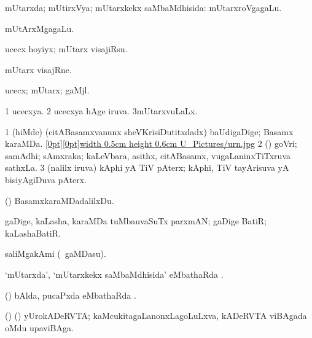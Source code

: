 {{\bentry
{} 
\gl{\gu}
\expl{}
\bmng
mUtarxda; mUtirxVya; mUtarxkekx saMbaMdhisida:  mUtarxroVgagaLu. 
\emng

\noindent 
\gl{\pagu}
\expl{}
\bmng
{} mUtArxMgagaLu. 
\emng
\eentry

\bentry
{} 
\gl{\akirx}
\expl{}
\bmng
ucecx hoyiyx; mUtarx visajiRsu. 
\emng
\eentry

\bentry
{} 
\gl{\nA}
\expl{}
\bmng
mUtarx visajRne. 
\emng
\eentry

\bentry
{} 
\gl{\nA}
\expl{}
\bmng
ucecx; mUtarx; gaMjl. 
\emng
\eentry

\bentry
{} 
\gl{\gu}
\expl{}
\bmng
{} 
\emng
\eentry

\bentry
{} 
\gl{\gu}
\expl{}
\bmng
\bnum
\num{1} ucecxya. 
\num{2} ucecxya hAge iruva. 
\num{3}mUtarxvuLaLx. 
\enum
\emng
\eentry

{} 
\gl{\nA}
\expl{}
\bmng
\bnum
\num{1} (hiMde) (citABasamxvanunx sheVKrisiDutitxdadx) baUdigaDige; Basamx karaMDa. \quad\hyperlink{urnfigure}{\raisebox{-0.15cm}[0pt][0pt]{\pdfimage width 0.5cm height 0.6cm {U_Pictures/urn.jpg}}} 
\num{2} (\kAparx) goVri; samAdhi; sAmxraka; kaLeVbara, asithx, citABasamx, \mo vugaLaninxTiTxruva sathxLa. 
\num{3} (nalilx iruva) kAphi yA TiV pAterx; kAphi, TiV tayArisuva yA bisiyAgiDuva pAterx. 
\enum
\emng
\eentry

\bentry
{} 
\gl{\sakirx}
\expl{}
\bmng
(\pArxparx) BasamxkaraMDadalilxDu. 
\emng
\eentry

\bentry
{} 
\gl{\nA}
\bmng
gaDige, kaLasha, karaMDa tuMbauvaSuTx parxmAN; gaDige BatiR; kaLashaBatiR. 
\emng
\eentry

\bentry
{} 
\gl{\nA}
\expl{}
\bmng
saliMgakAmi (\sA\ gaMDasu). 
\emng
\eentry

\bentry
{} 
\gl{\sapUpa}
\expl{}
\bmng
`mUtarxda', `mUtarxkekx saMbaMdhisida' eMbathaRda \sapUpa. 
\emng
\eentry

\bentry
{} 
\gl{\sapUpa}
\expl{}
\bmng
(\pArxvi) bAlda, pucaPxda eMbathaRda \sapUpa. 
\emng
\eentry

\bentry
{} 
\gl{\nA}
\expl{}
\bmng
(\bava) (\pArxvi) yUrokADeRVTA; kaMcukitagaLanonxLagoLuLxva, kADeRVTA viBAgada oMdu upaviBAga. 
\emng
\eentry

}}
